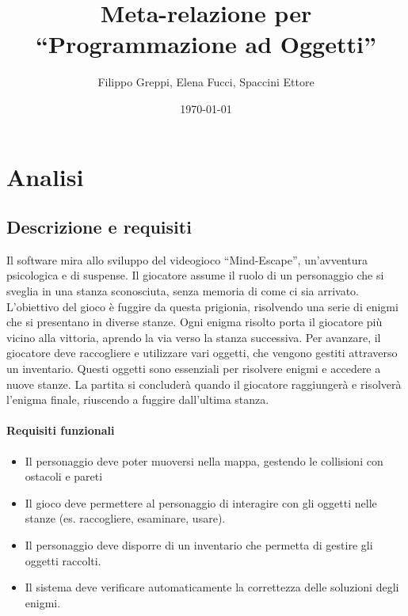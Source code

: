 \documentclass[a4paper,12pt]{report}
\title{Meta-relazione per\\``Programmazione ad Oggetti''}
\author{Filippo Greppi, Elena Fucci, Spaccini Ettore}
\date{\today}
\begin{document}
\maketitle

\begin{abstract}

\end{abstract}

\tableofcontents

\chapter{Analisi}

\section{Descrizione e requisiti}
Il software mira allo sviluppo del videogioco “Mind-Escape”, un’avventura psicologica e di suspense. Il giocatore assume il ruolo di un personaggio che si sveglia in una stanza sconosciuta, senza memoria di come ci sia arrivato. L’obiettivo del gioco è fuggire da questa prigionia, risolvendo una serie di enigmi che si presentano in diverse stanze. Ogni enigma risolto porta il giocatore più vicino alla vittoria, aprendo la via verso la stanza successiva.
%
Per avanzare, il giocatore deve raccogliere e utilizzare vari oggetti, che vengono gestiti attraverso un inventario. Questi oggetti sono essenziali per risolvere enigmi e accedere a nuove stanze.
%
La partita si concluderà quando il giocatore raggiungerà e risolverà l’enigma finale, riuscendo a fuggire dall’ultima stanza.
%

\subsubsection{Requisiti funzionali}
\begin{itemize}
	\item Il personaggio deve poter muoversi nella mappa, gestendo le collisioni con ostacoli e pareti
	\item Il gioco deve permettere al personaggio di interagire con gli oggetti nelle stanze (es. raccogliere, esaminare, usare).
	\item Il personaggio deve disporre di un inventario che permetta di gestire gli oggetti raccolti.
	\item Il sistema deve verificare automaticamente la correttezza delle soluzioni degli enigmi.
\end{itemize}
\end{document}
